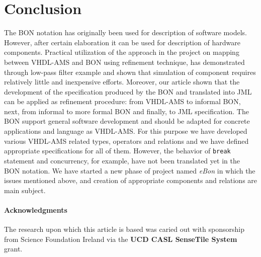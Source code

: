 \documentclass{article}
\begin{document}
\section{Conclusion}
\label{sec:conclusion} 

The BON notation has originally been used for description of software
models. However, after certain elaboration it can be used for
description of hardware components. Practical utilization of the
approach in the project on mapping between VHDL-AMS and BON using
refinement technique, has demonstrated through low-pass filter example
and shown that simulation of component requires relatively little and
inexpensive efforts. Moreover, our article shown that the development
of the specification produced by the BON and translated into JML can
be applied as refinement procedure: from VHDL-AMS to informal BON,
next, from informal to more formal BON and finally, to JML
specification.  The BON support general software development and
should be adapted for concrete applications and language as
VHDL-AMS. For this purpose we have developed various VHDL-AMS related
types, operators and relations and we have defined appropriate
specifications for all of them. However, the behavior of
\texttt{break} statement and concurrency, for example, have not been
translated yet in the BON notation. We have started a new phase of
project named \emph{eBon} in which the issues mentioned above, and
creation of appropriate components and relations are main subject.

\paragraph{Acknowledgments} The research upon which this article is
based was caried out with sponsorship from Science Foundation Ireland
via the \textbf{UCD CASL SenseTile System} grant.




\end{document}
